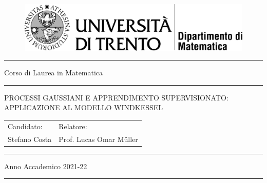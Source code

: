

\begin{figure}[H]
\centering
\includegraphics{images/dmtesi.png}
\end{figure}

\setlength{\parskip}{-12pt} %
\noindent\rule{\textwidth}{1pt}
\begin{center}
\Large Corso di Laurea  in Matematica
\end{center}
\noindent\rule{\textwidth}{1pt}

\vspace{5 cm} %


\begin{center}
{\fontsize{20}{30} \selectfont PROCESSI GAUSSIANI E APPRENDIMENTO SUPERVISIONATO: APPLICAZIONE AL MODELLO WINDKESSEL \par} %
\end{center}


\vspace{6 cm} %


\begin{large}
\begin{tabular}{m{7cm}l}
Candidato: & Relatore:\\
Stefano Costa & Prof. Lucas Omar Müller
\end{tabular}
\end{large}


\vfill %

\setlength{\parskip}{-18pt} %
\noindent\rule{\textwidth}{1pt}
\begin{center}
{Anno Accademico 2021-22}
\end{center}
\noindent\rule{\textwidth}{1pt}
\setlength{\parskip}{0pt} %
